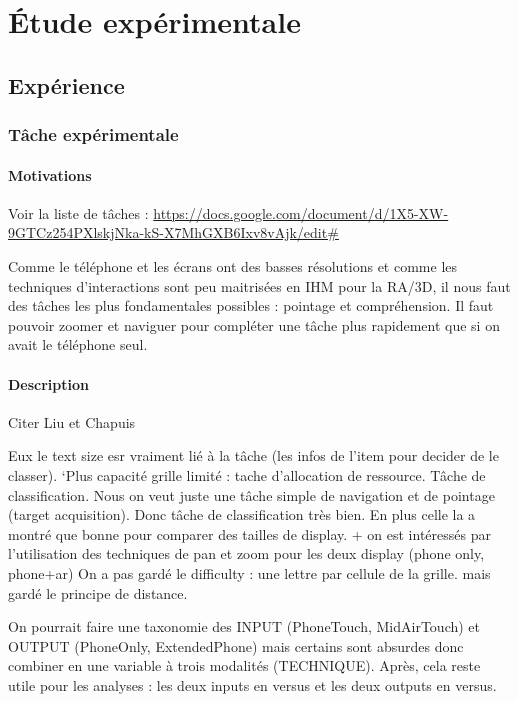 \chapter{Étude expérimentale}
\label{ch:experiment}

\section{Expérience}
\subsection{Tâche expérimentale}
\subsubsection{Motivations}
Voir la liste de tâches : \url{https://docs.google.com/document/d/1X5-XW-9GTCz254PXlskjNka-kS-X7MhGXB6Ixv8vAjk/edit#}

Comme le téléphone et les écrans ont des basses résolutions et comme les techniques d'interactions sont peu maitrisées en IHM pour la RA/3D\citep{Piumsomboon2013}, il nous faut des tâches les plus fondamentales possibles : pointage et compréhension. Il faut pouvoir zoomer et naviguer pour compléter une tâche plus rapidement que si on avait le téléphone seul.

\subsubsection{Description}
Citer Liu et Chapuis

Eux le text size esr vraiment lié à la tâche (les infos de l'item pour decider de le classer). `Plus capacité grille limité : tache d'allocation de ressource. Tâche de classification.
Nous on veut juste une tâche simple de navigation et de pointage (target acquisition). Donc tâche de classification très bien. En plus celle la a montré que bonne pour comparer des tailles de display. + on est intéressés par l'utilisation des techniques de pan et zoom pour les deux display (phone only, phone+ar)
On a pas gardé le difficulty : une lettre par cellule de la grille. mais gardé le principe de distance.

On pourrait faire une taxonomie des INPUT (PhoneTouch, MidAirTouch) et OUTPUT (PhoneOnly, ExtendedPhone) mais certains sont absurdes donc combiner en une variable à trois modalités (TECHNIQUE). Après, cela reste utile pour les analyses : les deux inputs en versus et les deux outputs en versus.

